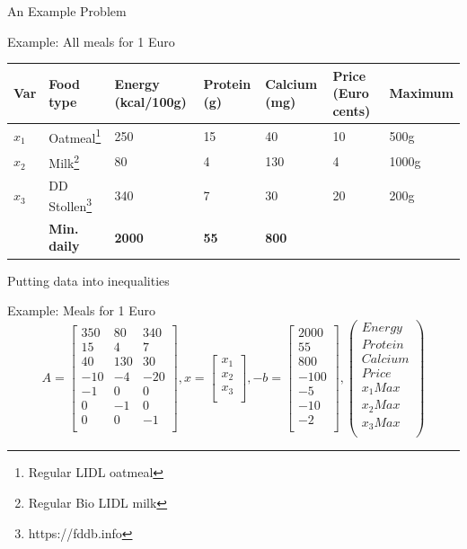 \documentclass[10pt]{beamer}
\begin{document}
\begin{frame}{An Example Problem}
	\begin{exampleblock}{Example: All meals for 1 Euro}
	\vspace{0.4cm}
	\begin{tabular}{|p{0.35cm}|l|p{1.5cm}|p{0.9cm}|p{}|p{0.75cm}|p{1.5cm}|}
		\hline
		Var&Food type&Energy (kcal/100g)&Protein (g)&Calcium (mg)&Price (Euro cents)&Maximum\\
		\hline
		$x_1$&Oatmeal\footnote{Regular LIDL oatmeal}&250&15&40&10&500g\\
		$x_2$&Milk\footnote{Regular Bio LIDL milk}&80&4&130&4&1000g\\
		$x_3$&DD Stollen\footnote{https://fddb.info}&340&7&30&20&200g\\
		\hline
		&\textbf{Min. daily}&\textbf{2000}&\textbf{55}&\textbf{800}&&\\
		\hline
	\end{tabular}
	\vspace{0.4cm}
	\end{exampleblock}	
\end{frame}

\begin{frame}{Putting data into inequalities}
	\begin{exampleblock}{Example: Meals for 1 Euro}
		\begin{equation*}
			A = \begin{bmatrix}
			350&80&340\\
			15&4&7\\
			40&130&30\\
			-10&-4&-20\\
			-1&0&0\\
			0&-1&0\\
			0&0&-1\\
			\end{bmatrix},
			x = \begin{bmatrix}
			x_1\\x_2\\x_3\\
			\end{bmatrix},
			-b = \begin{bmatrix}
			2000\\
			55\\
			800\\
			-100\\
			-5\\
			-10\\
			-2\\
			\end{bmatrix},
			\begin{pmatrix}
			Energy\\
			Protein\\
			Calcium\\
			Price\\
			x_1Max\\
			x_2Max\\
			x_3Max\\
			\end{pmatrix}
		\end{equation*}
	\end{exampleblock}
\end{frame}
\end{document}
